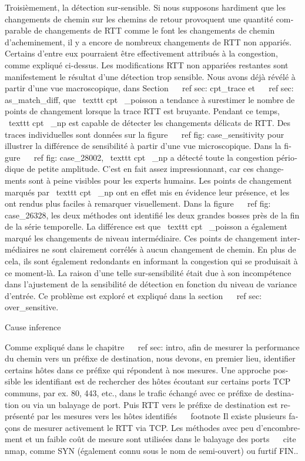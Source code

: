 \begin{otherlanguage}{french}
{{Troisièmement, la détection sur-sensible.
Si nous supposons hardiment que les changements de chemin sur les chemins de retour provoquent une quantité comparable de changements de RTT comme le font les changements de chemin d'acheminement, il y a encore de nombreux changements de RTT non appariés.
Certains d'entre eux pourraient être effectivement attribués à la congestion, comme expliqué ci-dessus.
Les modifications RTT non appariées restantes sont manifestement le résultat d'une détection trop sensible.
Nous avons déjà révélé à partir d'une vue macroscopique, dans Section ~ \ ref {sec: cpt_trace} et ~ \ ref {sec: as_match_diff}, que \ texttt {cpt \ _poisson} a tendance à surestimer le nombre de points de changement lorsque la trace RTT est bruyante.
Pendant ce temps, \ texttt {cpt \ _np} est capable de détecter les changements délicats de RTT.
Des traces individuelles sont données sur la figure ~ \ ref {fig: case_sensitivity} pour illustrer la différence de sensibilité à partir d'une vue microscopique.
Dans la figure ~ \ ref {fig: case_28002}, \ texttt {cpt \ _np} a détecté toute la congestion périodique de petite amplitude.
C'est en fait assez impressionnant, car ces changements sont à peine visibles pour les experts humains.
Les points de changement marqués par \ texttt {cpt \ _np} ont en effet mis en évidence leur présence, et les ont rendus plus faciles à remarquer visuellement.
Dans la figure ~ \ ref {fig: case_26328}, les deux méthodes ont identifié les deux grandes bosses près de la fin de la série temporelle.
La différence est que \ texttt {cpt \ _poisson} a également marqué les changements de niveau intermédiaire.
Ces points de changement intermédiaires ne sont clairement corrélés à aucun changement de chemin.
En plus de cela, ils sont également redondants en informant la congestion qui se produisait à ce moment-là.
La raison d'une telle sur-sensibilité était due à son incompétence dans l'ajustement de la sensibilité de détection en fonction du niveau de variance d'entrée. Ce problème est exploré et expliqué dans la section ~ \ ref {sec: over_sensitive}.

Cause inference

Comme expliqué dans le chapitre ~ \ ref {sec: intro}, afin de mesurer la performance du chemin vers un préfixe de destination, nous devons, en premier lieu, identifier certains hôtes dans ce préfixe qui répondent à nos mesures.
Une approche possible les identifiant est de rechercher des hôtes écoutant sur certains ports TCP communs, par ex. 80, 443, etc., dans le trafic échangé avec ce préfixe de destination ou via un balayage de port.
Puis RTT vers le préfixe de destination est représenté par les mesures vers les hôtes identifiés ~ \ footnote {Il existe plusieurs façons de mesurer activement le RTT via TCP. Les méthodes avec peu d'encombrement et un faible coût de mesure sont utilisées dans le balayage des ports ~ \ cite {nmap}, comme SYN (également connu sous le nom de semi-ouvert) ou furtif FIN.}.

}}
\end{otherlanguage}
